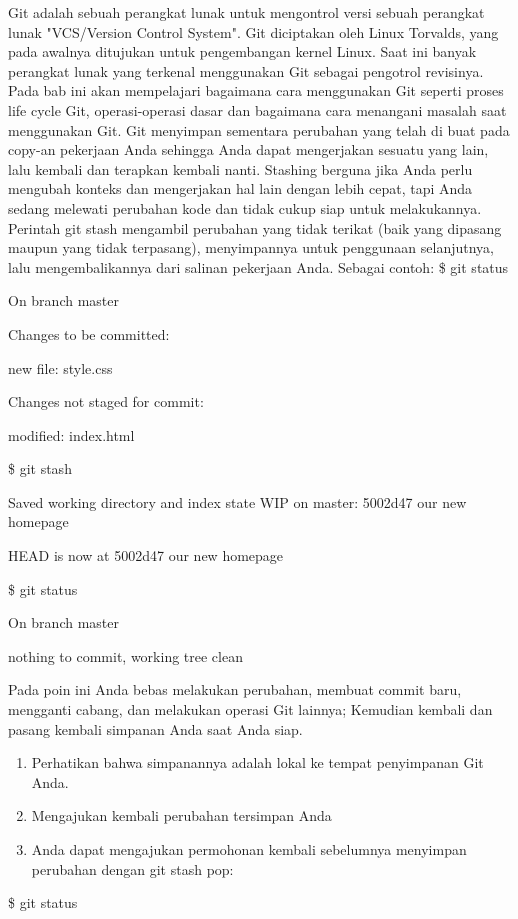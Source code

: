 Git adalah sebuah perangkat lunak untuk mengontrol versi sebuah 
perangkat lunak "VCS/Version Control System". Git diciptakan oleh Linux 
Torvalds, yang pada awalnya ditujukan untuk pengembangan kernel Linux. 
Saat ini banyak perangkat lunak yang terkenal menggunakan Git sebagai 
pengotrol revisinya.
\vspace{12pt}
Pada bab ini akan mempelajari bagaimana cara menggunakan Git seperti 
proses life cycle Git, operasi-operasi dasar dan bagaimana cara 
menangani masalah saat menggunakan Git.
\vspace{12pt}
Git menyimpan sementara perubahan yang telah di buat pada copy-an 
pekerjaan Anda sehingga Anda dapat mengerjakan sesuatu yang lain, lalu 
kembali dan terapkan kembali nanti. Stashing berguna jika Anda perlu 
mengubah konteks dan mengerjakan hal lain dengan lebih cepat, tapi Anda 
sedang melewati perubahan kode dan tidak cukup siap untuk melakukannya. 
\vspace{12pt}
Perintah git stash mengambil perubahan yang tidak terikat (baik yang 
dipasang maupun yang tidak terpasang), menyimpannya untuk penggunaan 
selanjutnya, lalu mengembalikannya dari salinan pekerjaan Anda. Sebagai 
contoh:
\vspace{12pt}
\$ git status

On branch master

Changes to be committed:

new file: style.css

Changes not staged for commit:

modified: index.html

\$ git stash

Saved working directory and index state WIP on master: 5002d47 our new 
homepage

HEAD is now at 5002d47 our new homepage

\$ git status

On branch master

nothing to commit, working tree clean

Pada poin ini Anda bebas melakukan perubahan, membuat commit baru, 
mengganti cabang, dan melakukan operasi Git lainnya; Kemudian kembali 
dan pasang kembali simpanan Anda saat Anda siap.
\vspace{12pt}
\begin{enumerate}
\item Perhatikan bahwa simpanannya adalah lokal ke tempat penyimpanan 
Git Anda. 
\item Mengajukan kembali perubahan tersimpan Anda
\item Anda dapat mengajukan permohonan kembali sebelumnya menyimpan 
perubahan dengan git stash pop:
\setcounter{numberedCntD}{\theenumi}
\end{enumerate}
\$ git status

